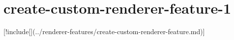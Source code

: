 \chapter{create-\/custom-\/renderer-\/feature-\/1}
\hypertarget{md__hey_tea_9_2_library_2_package_cache_2com_8unity_8render-pipelines_8universal_0d14_80_88_2_do9bd067c5016e2e3eaa3236492050dea3}{}\label{md__hey_tea_9_2_library_2_package_cache_2com_8unity_8render-pipelines_8universal_0d14_80_88_2_do9bd067c5016e2e3eaa3236492050dea3}
\mbox{[}!include\mbox{[}\mbox{]}(../renderer-\/features/create-\/custom-\/renderer-\/feature.md)\mbox{]} 